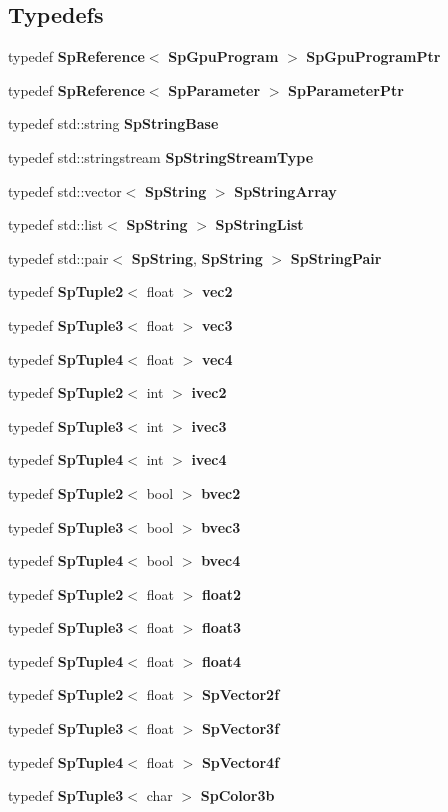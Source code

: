 \subsection*{Typedefs}
\begin{CompactItemize}
\item 
typedef {\bf Sp\-Reference}$<$ {\bf Sp\-Gpu\-Program} $>$ {\bf Sp\-Gpu\-Program\-Ptr}
\item 
typedef {\bf Sp\-Reference}$<$ {\bf Sp\-Parameter} $>$ {\bf Sp\-Parameter\-Ptr}
\item 
typedef std::string {\bf Sp\-String\-Base}
\item 
typedef std::stringstream {\bf Sp\-String\-Stream\-Type}
\item 
typedef std::vector$<$ {\bf Sp\-String} $>$ {\bf Sp\-String\-Array}
\item 
typedef std::list$<$ {\bf Sp\-String} $>$ {\bf Sp\-String\-List}
\item 
typedef std::pair$<$ {\bf Sp\-String}, {\bf Sp\-String} $>$ {\bf Sp\-String\-Pair}
\item 
typedef {\bf Sp\-Tuple2}$<$ float $>$ {\bf vec2}
\item 
typedef {\bf Sp\-Tuple3}$<$ float $>$ {\bf vec3}
\item 
typedef {\bf Sp\-Tuple4}$<$ float $>$ {\bf vec4}
\item 
typedef {\bf Sp\-Tuple2}$<$ int $>$ {\bf ivec2}
\item 
typedef {\bf Sp\-Tuple3}$<$ int $>$ {\bf ivec3}
\item 
typedef {\bf Sp\-Tuple4}$<$ int $>$ {\bf ivec4}
\item 
typedef {\bf Sp\-Tuple2}$<$ bool $>$ {\bf bvec2}
\item 
typedef {\bf Sp\-Tuple3}$<$ bool $>$ {\bf bvec3}
\item 
typedef {\bf Sp\-Tuple4}$<$ bool $>$ {\bf bvec4}
\item 
typedef {\bf Sp\-Tuple2}$<$ float $>$ {\bf float2}
\item 
typedef {\bf Sp\-Tuple3}$<$ float $>$ {\bf float3}
\item 
typedef {\bf Sp\-Tuple4}$<$ float $>$ {\bf float4}
\item 
typedef {\bf Sp\-Tuple2}$<$ float $>$ {\bf Sp\-Vector2f}
\item 
typedef {\bf Sp\-Tuple3}$<$ float $>$ {\bf Sp\-Vector3f}
\item 
typedef {\bf Sp\-Tuple4}$<$ float $>$ {\bf Sp\-Vector4f}
\item 
typedef {\bf Sp\-Tuple3}$<$ char $>$ {\bf Sp\-Color3b}

\end{CompactItemize}
